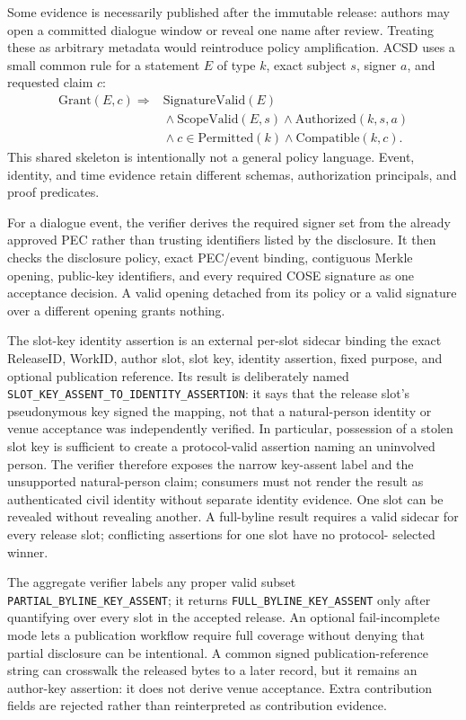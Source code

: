 \documentclass[acmsmall,screen,review,nonacm]{acmart}
\newcommand{\releaseid}{\textsf{ReleaseID}}
\begin{document}
Some evidence is necessarily published after the immutable release: authors
may open a committed dialogue window or reveal one name after review. Treating
these as arbitrary metadata would reintroduce policy amplification. ACSD uses
a small common rule for a statement $E$ of type $k$, exact subject $s$, signer
$a$, and requested claim $c$:
\[
\begin{aligned}
 \mathrm{Grant}(E,c) \Rightarrow{}& \mathrm{SignatureValid}(E) \\
 &{}\land \mathrm{ScopeValid}(E,s)
 \land \mathrm{Authorized}(k,s,a) \\
 &{}\land c\in\mathrm{Permitted}(k)
 \land \mathrm{Compatible}(k,c).
\end{aligned}
\]
This shared skeleton is intentionally not a general policy language. Event,
identity, and time evidence retain different schemas, authorization principals,
and proof predicates.

For a dialogue event, the verifier derives the required signer set from the
already approved PEC rather than trusting identifiers listed by the disclosure.
It then checks the disclosure policy, exact PEC/event binding, contiguous
Merkle opening, public-key identifiers, and every required COSE signature as
one acceptance decision. A valid opening detached from its policy or a valid
signature over a different opening grants nothing.

The slot-key identity assertion is an external per-slot sidecar binding the exact
\releaseid, WorkID, author slot, slot key, identity assertion, fixed purpose,
and optional publication reference. Its result is deliberately named
\texttt{SLOT\_KEY\_ASSENT\_TO\_IDENTITY\_ASSERTION}: it says that the release
slot's pseudonymous key signed the mapping, not that a natural-person identity
or venue acceptance was independently verified. In particular, possession of
a stolen slot key is sufficient to create a protocol-valid assertion naming an
uninvolved person. The verifier therefore exposes the narrow key-assent label
and the unsupported natural-person claim; consumers must not render the result
as authenticated civil identity without separate identity evidence. One slot can be revealed
without revealing another. A full-byline result requires a valid sidecar for
every release slot; conflicting assertions for one slot have no protocol-
selected winner.

The aggregate verifier labels any proper valid subset
\texttt{PARTIAL\_BYLINE\_KEY\_ASSENT}; it returns
\texttt{FULL\_BYLINE\_KEY\_ASSENT} only after quantifying over every slot in
the accepted release. An optional fail-incomplete mode lets a publication
workflow require full coverage without denying that partial disclosure can be
intentional. A common signed publication-reference string can crosswalk the
released bytes to a later record, but it remains an author-key assertion: it
does not derive venue acceptance. Extra contribution fields are rejected
rather than reinterpreted as contribution evidence.
\end{document}
